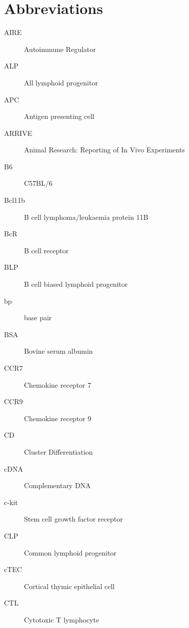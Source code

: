 
\chapter{Abbreviations}

\begin{description}



\item[AIRE]		
Autoimmune Regulator

\item[ALP]
All lymphoid progenitor

\item[APC]
Antigen presenting cell

\item[ARRIVE] 
Animal Research: Reporting of In Vivo Experiments

\item[B6]
C57BL/6

\item[Bcl11b]
B cell lymphoma/leukaemia protein 11B

\item[BcR]
B cell receptor

\item[BLP]
B cell biased lymphoid progenitor

\item[bp]
base pair

\item[BSA]
Bovine serum albumin

\item[CCR7]
Chemokine receptor 7

\item[CCR9]
Chemokine receptor 9

\item[CD]
Cluster Differentiation

\item[cDNA]
Complementary DNA

\item[c-kit]
Stem cell growth factor receptor

\item[CLP]
Common lymphoid progenitor

\item[cTEC]
Cortical thymic epithelial cell

\item[CTL]
Cytotoxic T lymphocyte


\end{description}
